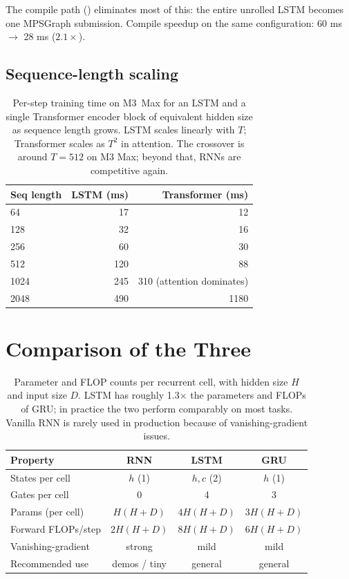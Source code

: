 The compile path () eliminates most of
this: the entire unrolled LSTM becomes one MPSGraph
submission. Compile speedup on the same configuration:
60 ms $\to$ 28 ms ($2.1\times$).

\subsection{Sequence-length scaling}
\label{ssec:rnn_family:seq_scaling}

\begin{table}[t]
\centering
\small
\begin{tabular}{lrr}
\toprule
Seq length & LSTM (ms) & Transformer (ms) \\
\midrule
64    & 17  & 12 \\
128   & 32  & 16 \\
256   & 60  & 30 \\
512   & 120 & 88 \\
1024  & 245 & 310 (attention dominates) \\
2048  & 490 & 1180 \\
\bottomrule
\end{tabular}
\caption[Sequence-length scaling: LSTM vs Transformer.]{Per-step
training time on M3~Max for an LSTM and a single
Transformer encoder block of equivalent hidden size as
sequence length grows. LSTM scales linearly with $T$;
Transformer scales as $T^2$ in attention. The crossover is
around $T = 512$ on M3 Max; beyond that, RNNs are competitive
again.}
\label{tab:rnn_family:seq_scaling}
\end{table}

\section{Comparison of the Three}
\label{sec:rnn_family:comparison}

\begin{table}[t]
\centering
\small
\begin{tabular}{lccc}
\toprule
Property & RNN & LSTM & GRU \\
\midrule
States per cell  & $h$ (1) & $h, c$ (2) & $h$ (1) \\
Gates per cell   & 0       & 4          & 3      \\
Params (per cell) & $H(H+D)$ & $4H(H+D)$ & $3H(H+D)$ \\
Forward FLOPs/step & $2H(H+D)$ & $8H(H+D)$ & $6H(H+D)$ \\
Vanishing-gradient & strong  & mild      & mild   \\
Recommended use & demos / tiny & general & general \\
\bottomrule
\end{tabular}
\caption[RNN/LSTM/GRU comparison.]{Parameter and FLOP counts per
recurrent cell, with hidden size $H$ and input size $D$. LSTM
has roughly 1.3$\times$ the parameters and FLOPs of GRU; in
practice the two perform comparably on most tasks. Vanilla RNN
is rarely used in production because of vanishing-gradient
issues.}
\label{tab:rnn_family:comparison}
\end{table}

